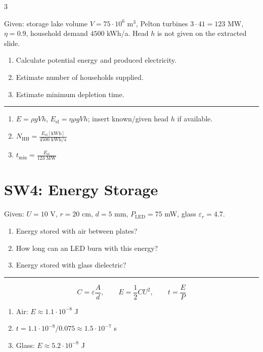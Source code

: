 \documentclass[9pt, landscape, a4paper]{article}
\newcommand{\hr}{\vspace{0.1cm}\par\vspace{-.5\ht\strutbox}\noindent\rule{\linewidth}{.5pt}\par\vspace{0.1cm}}
\begin{document}
\begin{multicols*}{3}
\begin{exercisebox}
  Given: storage lake volume $V=75\cdot10^6$ m$^3$, Pelton turbines $3\cdot41=123$ MW,
  $\eta=0.9$, household demand $4500$ kWh/a. Head $h$ is not given on the extracted slide.
  \begin{enumerate}[label=\alph*.]
    \item Calculate potential energy and produced electricity.
    \item Estimate number of households supplied.
    \item Estimate minimum depletion time.
  \end{enumerate}
  \hr
  \begin{enumerate}[label=\alph*.]
    \item $E=\rho gVh$, \quad $E_\text{el}=\eta\rho gVh$; insert known/given head $h$ if available.
    \item $N_\text{HH}=\frac{E_\text{el}[\text{kWh}]}{4500\text{ kWh/a}}$
    \item $t_\text{min}=\frac{E_\text{el}}{123\text{ MW}}$
  \end{enumerate}
\end{exercisebox}

\section{SW4: Energy Storage}
\begin{exercisebox}
  Given: $U=10$ V, $r=20$ cm, $d=5$ mm, $P_\text{LED}=75$ mW, glass $\varepsilon_r=4.7$.
  \begin{enumerate}[label=\alph*.]
    \item Energy stored with air between plates?
    \item How long can an LED burn with this energy?
    \item Energy stored with glass dielectric?
  \end{enumerate}
  \hr
  \[
    C=\varepsilon\frac{A}{d}, \qquad E=\frac12CU^2, \qquad t=\frac{E}{P}
  \]
  \begin{enumerate}[label=\alph*.]
    \item Air: $E\approx1.1\cdot10^{-8}$ J
    \item $t=1.1\cdot10^{-8}/0.075\approx1.5\cdot10^{-7}$ s
    \item Glass: $E\approx5.2\cdot10^{-8}$ J
  \end{enumerate}
\end{exercisebox}


\end{multicols*}
\end{document}
